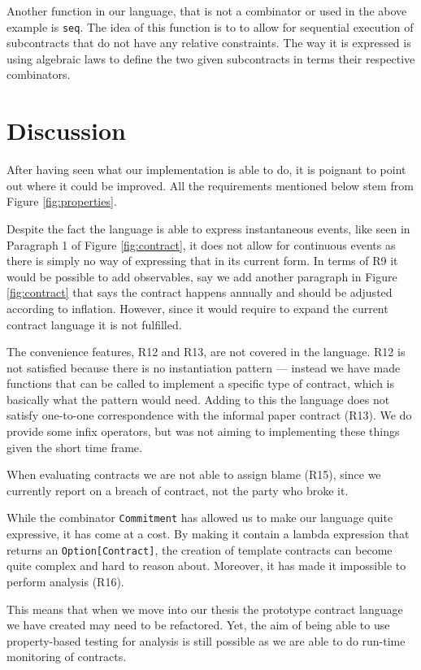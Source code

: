 \documentclass{ituthesis}
\begin{document}
Another function in our language, that is not a combinator or used in the above example is \texttt{seq}. The idea of this function is to to allow for sequential execution of subcontracts that do not have any relative constraints. The way it is expressed is using algebraic laws to define the two given subcontracts in terms their respective combinators.


\chapter{Discussion}
After having seen what our implementation is able to do, it is poignant to point out where it could be improved. All the requirements mentioned below stem from Figure \ref{fig:properties}.

Despite the fact the language is able to express instantaneous events, like seen in Paragraph 1 of Figure \ref{fig:contract}, it does not allow for continuous events as there is simply no way of expressing that in its current form. In terms of R9 it would be possible to add observables, say we add another paragraph in Figure \ref{fig:contract} that says the contract happens annually and should be adjusted according to inflation. However, since it would require to expand the current contract language it is not fulfilled.

The convenience features, R12 and R13, are not covered in the language. R12 is not satisfied because there is no instantiation pattern --- instead we have made functions that can be called to implement a specific type of contract, which is basically what the pattern would need. Adding to this the language does not satisfy one-to-one correspondence with the informal paper contract (R13). We do provide some infix operators, but was not aiming to implementing these things given the short time frame.

When evaluating contracts we are not able to assign blame (R15), since we currently report on a breach of contract, not the party who broke it.

While the combinator \texttt{Commitment} has allowed us to make our language quite expressive, it has come at a cost. By making it contain a lambda expression that returns an \texttt{Option[Contract]}, the creation of template contracts can become quite complex and hard to reason about. Moreover, it has made it impossible to perform analysis (R16).

This means that when we move into our thesis the prototype contract language we have created may need to be refactored. Yet, the aim of being able to use property-based testing for analysis is still possible as we are able to do run-time monitoring of contracts.
\end{document}
